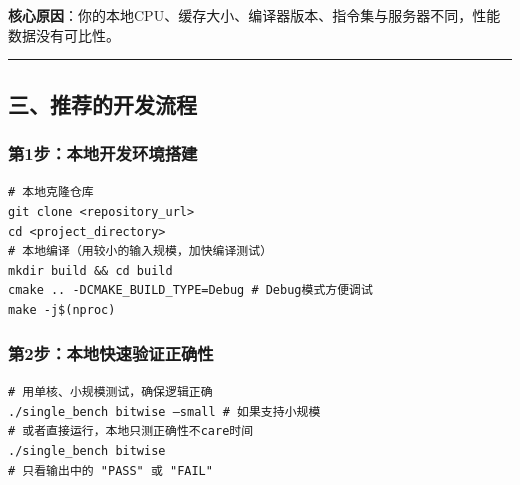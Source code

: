 \documentclass[11pt, a4paper]{article}
\begin{document}
\begin{aibox}
\textbf{核心原因}：你的本地CPU、缓存大小、编译器版本、指令集与服务器不同，性能数据没有可比性。

\begin{center}\rule{\textwidth}{0.4pt}\end{center}

\subsection*{三、推荐的开发流程}

\subsubsection*{第1步：本地开发环境搭建}
\begin{tcolorbox}[colback=white,colframe=gray!50!white,boxrule=0.5pt,arc=2pt,left=5pt,right=5pt,top=5pt,bottom=5pt]
\texttt{\# 本地克隆仓库}\\
\texttt{git clone \textless repository\_url\textgreater }\\
\texttt{cd \textless project\_directory\textgreater }\\[0.5em]
\texttt{\# 本地编译（用较小的输入规模，加快编译测试）}\\
\texttt{mkdir build \&\& cd build}\\
\texttt{cmake .. -DCMAKE\_BUILD\_TYPE=Debug  \# Debug模式方便调试}\\
\texttt{make -j\$(nproc)}
\end{tcolorbox}

\subsubsection*{第2步：本地快速验证正确性}
\begin{tcolorbox}[colback=white,colframe=gray!50!white,boxrule=0.5pt,arc=2pt,left=5pt,right=5pt,top=5pt,bottom=5pt]
\texttt{\# 用单核、小规模测试，确保逻辑正确}\\
\texttt{./single\_bench bitwise --small  \# 如果支持小规模}\\[0.5em]
\texttt{\# 或者直接运行，本地只测正确性不care时间}\\
\texttt{./single\_bench bitwise}\\
\texttt{\# 只看输出中的 "PASS" 或 "FAIL"}
\end{tcolorbox}


\end{aibox}
\end{document}
